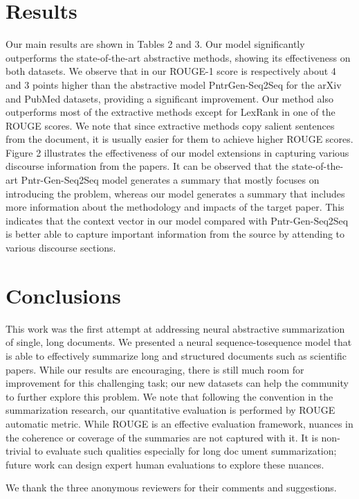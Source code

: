 \documentclass[aps,floatfix,prd,showpacs,twocolumn]{revtex4}
\begin{document}
\section{Results}
Our main results are shown in Tables 2
and 3. Our model significantly outperforms the
state-of-the-art abstractive methods, showing its
effectiveness on both datasets. We observe that
in our ROUGE-1 score is respectively about 4 and
3 points higher than the abstractive model PntrGen-Seq2Seq for the arXiv and PubMed datasets,
providing a significant improvement. Our method
also outperforms most of the extractive methods
except for LexRank in one of the ROUGE scores.
We note that since extractive methods copy salient
sentences from the document, it is usually easier for them to achieve higher ROUGE scores.
Figure 2 illustrates the effectiveness of our
model extensions in capturing various discourse
information from the papers. It can be observed
that the state-of-the-art Pntr-Gen-Seq2Seq model
generates a summary that mostly focuses on introducing the problem, whereas our model generates
a summary that includes more information about
the methodology and impacts of the target paper.
This indicates that the context vector in our model
compared with Pntr-Gen-Seq2Seq is better able to
capture important information from the source by
attending to various discourse sections.


\section{Conclusions}
This work was the first attempt at addressing
neural abstractive summarization of single, long
documents. We presented a neural sequence-tosequence model that is able to effectively summarize long and structured documents such as scientific papers. While our results are encouraging,
there is still much room for improvement for this
challenging task; our new datasets can help the
community to further explore this problem.
We note that following the convention in the
summarization research, our quantitative evaluation is performed by ROUGE automatic metric.
While ROUGE is an effective evaluation framework, nuances in the coherence or coverage of the
summaries are not captured with it. It is non-trivial
to evaluate such qualities especially for long document summarization; future work can design expert human evaluations to explore these nuances.

\acknowledgments
We thank the three anonymous reviewers for
their comments and suggestions.
\end{document}
